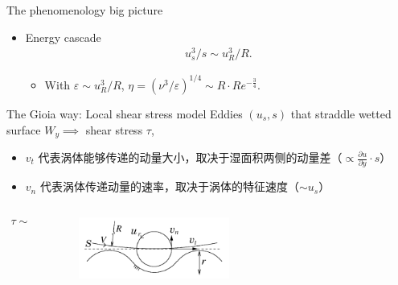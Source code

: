 \documentclass[10pt,xcolor={table,dvipsnames},t]{beamer}
\begin{document}
\begin{frame}{The phenomenology big picture}
    \begin{itemize}
        \item Energy cascade
            \begin{align*}
                u_s^3 / s \sim u_R^3 / R
            .\end{align*}
            \begin{itemize}
                \item With $\varepsilon \sim u_R^3 / R$, $\eta = \left( \nu^3 / \varepsilon \right)^{1 / 4}\sim R\cdot Re^{-\frac{3}{4}} $.
            \end{itemize}
    \end{itemize}
\end{frame}

\begin{frame}{The Gioia way: Local shear stress model}
    Eddies $\left( u_s, s \right) $ that straddle wetted surface $W_y\implies $ shear stress $\tau$,
    \begin{itemize}
        \item $v_t$ 代表涡体能够传递的动量大小，取决于湿面积两侧的动量差（$\propto \frac{\partial u}{\partial y}\cdot s $）
        \item $v_n$ 代表涡体传递动量的速率，取决于涡体的特征速度（$\sim u_s$）
    \end{itemize}
    \begin{columns}
        \begin{column}{0.5\textwidth}
            \begin{align*}
                \tau \sim \rho v_t v_n
            .\end{align*}
        \end{column}
        \begin{column}{0.5\textwidth}
            \begin{figure}[htpb]
                \centering
                \includegraphics[width=0.5\textwidth]{./figures/eddies.png}
                \label{fig:-figures-eddies-png}
            \end{figure}
        \end{column}

\end{columns}
\end{frame}
\end{document}
